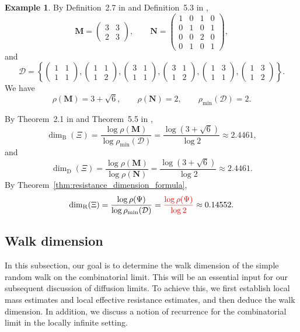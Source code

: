 \documentclass{article}
\DeclareRobustCommand{\revision}[1]{{\color{red}#1}}
\theoremstyle{plain}
\theoremstyle{definition}
\newtheorem{example}[theorem]{Example}
\newcommand{\dimbox}{\dim_\mathrm{B}}
\newcommand{\dimdeg}{\dim_\mathrm{D}}
\newcommand{\dimresis}{\dim_\mathrm{R}}
\begin{document}
\begin{example}
By Definition~2.7 in \cite{neroli2024fractal} and Definition~5.3 in \cite{li2024on},
\[
\mathbf M=
\begin{pmatrix}
3 & 3\\
2 & 3
\end{pmatrix},
\qquad
\mathbf N=
\begin{pmatrix}
1&0&1&0\\
0&1&0&1\\
0&0&2&0\\
0&1&0&1
\end{pmatrix},
\]
and
\[
\mathcal D=
\left\{
\begin{pmatrix}1&1\\ 1&1\end{pmatrix},
\begin{pmatrix}1&1\\ 1&2\end{pmatrix},
\begin{pmatrix}3&1\\ 1&1\end{pmatrix},
\begin{pmatrix}3&1\\ 1&2\end{pmatrix},
\begin{pmatrix}1&3\\ 1&1\end{pmatrix},
\begin{pmatrix}1&3\\ 1&2\end{pmatrix}
\right\}.
\]
We have
\[
\rho(\mathbf M)=3+\sqrt{6},
\qquad
\rho(\mathbf N)=2,
\qquad
\rho_{\min}(\mathcal D)=2.
\]

By Theorem~2.1 in \cite{neroli2024fractal} and Theorem~5.5 in \cite{li2024on},
\[
\dimbox(\Xi)
=
\frac{\log\rho(\mathbf M)}{\log\rho_{\min}(\mathcal D)}
=
\frac{\log(3+\sqrt{6})}{\log 2}
\approx 2.4461,
\]
and
\[
\dimdeg(\Xi)
=
\frac{\log\rho(\mathbf M)}{\log\rho(\mathbf N)}
=
\frac{\log(3+\sqrt{6})}{\log 2}
\approx 2.4461.
\]
By Theorem~\ref{thm:resistance_dimension_formula},
\[
\dimresis(\Xi)
=
\frac{\log \rho(\Psi)}{\log \rho_{\min}(\mathcal D)}
=
\revision{\frac{\log\rho(\Psi)}{\log 2}}
\approx 0.14552.
\]
\end{example}

\subsection{Walk dimension}\label{subsec:walk_dimension}

In this subsection, our goal is to determine the walk dimension of the simple random walk on the combinatorial limit.
This will be an essential input for our subsequent discussion of diffusion limits.
To achieve this, we first establish local mass estimates and local effective resistance estimates, and then deduce the walk dimension.
In addition, we discuss a notion of recurrence for the combinatorial limit in the locally infinite setting.
\end{document}
